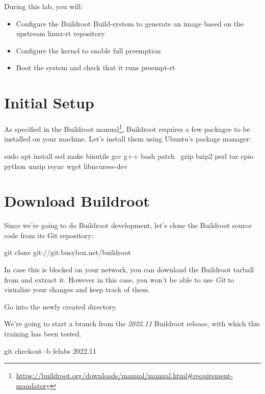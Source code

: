 
During this lab, you will:
\begin{itemize}
	\item Configure the Buildroot Build-system to generate an image based on the upstream linux-rt repository
	\item Configure the kernel to enable full preemption
	\item Boot the system and check that it runs preempt-rt
\end{itemize}

\section{Initial Setup}
As specified in the Buildroot
manual\footnote{\url{https://buildroot.org/downloads/manual/manual.html\#requirement-mandatory}},
Buildroot requires a few packages to be installed on your
machine. Let's install them using Ubuntu's package manager:

\begin{bashinput}
sudo apt install sed make binutils gcc g++ bash patch \
  gzip bzip2 perl tar cpio python unzip rsync wget libncurses-dev
\end{bashinput}

\section{Download Buildroot}

Since we're going to do Buildroot development, let's clone the
Buildroot source code from its Git repository:

\begin{bashinput}
git clone git://git.busybox.net/buildroot
\end{bashinput}

In case this is blocked on your network, you can download the Buildroot
tarball \code{buildroot-2022.11.tar.bz2} from
 and extract it. However in this
case, you won't be able to use {\em Git} to visualize your changes and
keep track of them.

Go into the newly created  directory.

We're going to start a branch from the {\em 2022.11} Buildroot
release, with which this training has been tested.

\begin{bashinput}
git checkout -b felabs 2022.11
\end{bashinput}

